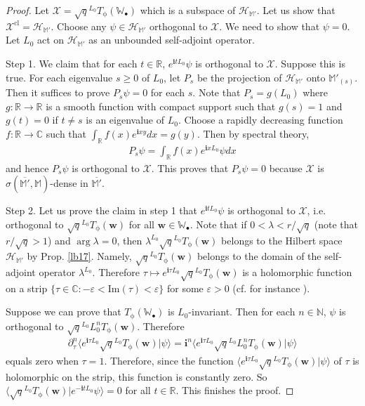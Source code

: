 \documentclass[11pt,b5paper,notitlepage]{article}
\theoremstyle{definition}
\theoremstyle{plain}
\newcommand{\mc}{\mathcal}
\newcommand{\ovl}{\overline}
\newcommand{\bk}[1]{\langle {#1}\rangle}
\newcommand{\bigbk}[1]{\big\langle {#1}\big\rangle}
\newcommand{\im}{\mathbf{i}}
\newcommand{\blt}{\bullet}
\newcommand{\Wbb}{\mathbb W}
\newcommand{\Mbb}{\mathbb M}
\newcommand{\Cbb}{\mathbb C}
\newcommand{\Nbb}{\mathbb N}
\newcommand{\Rbb}{\mathbb R}
\newcommand{\wbf}{\mathbf w}
\newcommand{\Imag}{\mathrm{Im}}
\newcommand{\cl}{\mathrm{cl}}
\numberwithin{equation}{section}
\begin{document}
\begin{proof}
Let $\mc X=\sqrt q^{L_0}T_\upphi(\Wbb_\blt)$ which is a subspace of $\mc H_{\Mbb'}$. Let us show that $\mc X^{\cl}=\mc H_{\Mbb'}$. Choose any $\psi\in \mc H_{\Mbb'}$ orthogonal to $\mc X$. We need to show that $\psi=0$. Let $L_0$ act on $\mc H_{\Mbb'}$ as an unbounded self-adjoint operator. 

Step 1. We claim that for each $t\in\Rbb$, $e^{\im tL_0}\psi$ is orthogonal to $\mc X$. Suppose this is true. For each eigenvalue $s\geq0$ of $L_0$, let $P_s$ be the projection of $\mc H_{\Mbb'}$ onto $\Mbb'_{(s)}$. Then it suffices to prove $P_s\psi=0$ for each $s$. Note that $P_s=g(L_0)$ where $g:\Rbb\rightarrow\Rbb$ is a smooth function with compact support such that $g(s)=1$ and $g(t)=0$ if $t\neq s$ is an eigenvalue of $L_0$.  Choose a rapidly decreasing function $f:\Rbb\rightarrow\Cbb$ such that $\int_\Rbb f(x)e^{\im xy}dx=g(y)$. Then by spectral theory,
\begin{align*}
P_s\psi=\int_\Rbb f(x)e^{\im x L_0} \psi dx
\end{align*}
and hence $P_s\psi$ is orthogonal to $\mc X$. This proves that $P_s\psi=0$ because $\mc X$ is $\sigma(\ovl{\Mbb'},\Mbb)$-dense in $\ovl{\Mbb'}$.

Step 2. Let us prove the claim in step 1 that $e^{\im t L_0}\psi$ is orthogonal to $\mc X$, i.e. orthogonal to $\sqrt q^{L_0}T_\upphi(\wbf)$ for all $\wbf\in\Wbb_\blt$. Note that if $0<\lambda<r/\sqrt q$ (note that $r/\sqrt q>1$) and $\arg\lambda=0$, then $\lambda^{L_0}\sqrt q^{L_0}T_\upphi(\wbf)$ belongs to the Hilbert space $\mc H_{\Mbb'}$ by Prop. \ref{lb17}. Namely, $\sqrt q^{L_0}T_\upphi(\wbf)$ belongs to the domain of the self-adjoint operator $\lambda ^{L_0}$.  Therefore $\tau\mapsto e^{\im\tau L_0}\sqrt q^{L_0}T_\upphi(\wbf)$ is a holomorphic function on a strip $\{\tau\in\Cbb:-\varepsilon<\Imag(\tau)<\varepsilon\}$ for some $\varepsilon>0$ (cf. for instance \cite[Chapter VI, Lem. 2.3]{Tak}).

Suppose we can prove that $T_\upphi(\Wbb_\blt)$ is $L_0$-invariant. Then for each $n\in\Nbb$, $\psi$ is orthogonal to $\sqrt q^{L_0}L_0^nT_\upphi(\wbf)$. Therefore
\begin{align*}
\partial_\tau^n \bigbk{e^{\im\tau L_0}\sqrt q^{L_0}T_\upphi(\wbf)\big|\psi}=\im^n\bigbk{e^{\im\tau L_0}\sqrt q^{L_0}L_0^nT_\upphi(\wbf)\big|\psi}
\end{align*}
equals zero when $\tau=1$. Therefore, since the function $\bk{e^{\im\tau L_0}\sqrt q^{L_0}T_\upphi(\wbf)|\psi}$ of $\tau$ is holomorphic on the strip, this function is constantly zero. So $\bk{\sqrt q^{L_0}T_\upphi(\wbf)|e^{-\im tL_0}\psi}=0$ for all $t\in\Rbb$. This finishes the proof.


\end{proof}
\end{document}

